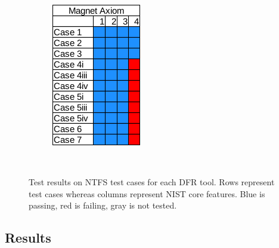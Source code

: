 \begin{figure}[h]
\begin{subfigure}{0.17\linewidth}
        \includegraphics[width=\linewidth]{fig/axiom_results_ntfs.png}
    \end{subfigure}~~
        
    \caption{Test results on NTFS test cases for each DFR tool. Rows represent test cases whereas columns represent NIST core features. Blue is passing, red is failing, gray is not tested.}
    \label{fig:results_ntfs}
\end{figure}

\subsection{Results}

